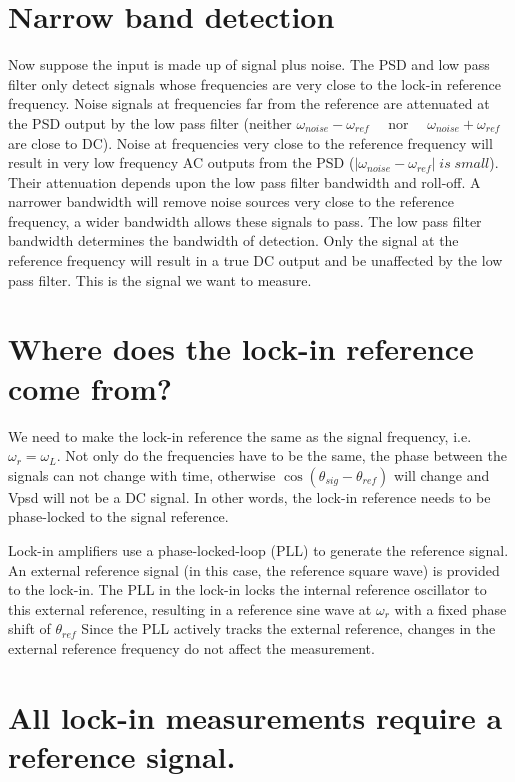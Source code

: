 \documentclass{../lab}
\begin{document}
\section{Narrow band detection}

Now suppose the input is made up of signal plus noise. The PSD and low pass filter only detect signals whose frequencies are very close to the lock-in reference frequency. Noise signals at frequencies far from the reference are attenuated at the PSD output by the low pass filter (neither $ \omega_{noise} - \omega_{ref} \quad $ nor $ \quad \omega_{noise} + \omega_{ref} $ are close to DC). Noise at frequencies very close to the reference frequency will result in very low frequency AC outputs from the PSD ($ | \omega_{noise} - \omega_{ref} | \; is \; small $). Their attenuation depends upon the low pass filter bandwidth and roll-off. A narrower bandwidth will remove noise sources very close to the reference frequency, a wider bandwidth allows these signals to pass. The low pass filter bandwidth determines the bandwidth of detection. Only the signal at the reference frequency will result in a true DC output and be unaffected by the low pass filter. This is the signal we want to measure.

\section{Where does the lock-in reference come from?}

We need to make the lock-in reference the same as the signal frequency, i.e. $  \omega_r = \omega_L $. Not only do the frequencies have to be the same, the phase between the signals can not change with time, otherwise $ \cos \left (\theta_{sig} - \theta_{ref} \right) $ will change and Vpsd will not be a DC signal. In other words, the lock-in reference needs to be phase-locked to the signal reference.

Lock-in amplifiers use a phase-locked-loop (PLL) to generate the reference signal. An external reference signal (in this case, the reference square wave) is provided to the lock-in. The PLL in the lock-in locks the internal reference oscillator to this external reference, resulting in a reference sine wave at $ \omega_r $ with a fixed phase shift of $  \theta_{ref} $ Since the PLL actively tracks the external reference, changes in the external reference frequency do not affect the measurement.

\section{All lock-in measurements require a reference signal.}
\end{document}
